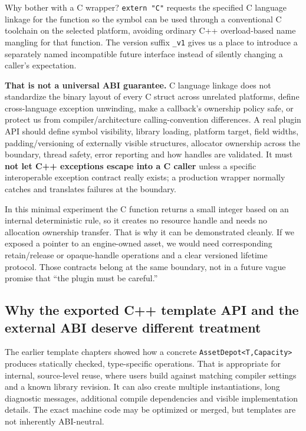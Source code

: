 Why bother with a C wrapper? \texttt{extern\ "C"} requests the specified C language linkage for the function so the symbol can be used through a conventional C toolchain on the selected platform, avoiding ordinary C++ overload-based name mangling for that function. The version suffix \texttt{\_v1} gives us a place to introduce a separately named incompatible future interface instead of silently changing a caller's expectation.

\textbf{That is not a universal ABI guarantee.} C language linkage does not standardize the binary layout of every C struct across unrelated platforms, define cross-language exception unwinding, make a callback's ownership policy safe, or protect us from compiler/architecture calling-convention differences. A real plugin API should define symbol visibility, library loading, platform target, field widths, padding/versioning of externally visible structures, allocator ownership across the boundary, thread safety, error reporting and how handles are validated. It must \textbf{not let C++ exceptions escape into a C caller} unless a specific interoperable exception contract really exists; a production wrapper normally catches and translates failures at the boundary.

In this minimal experiment the C function returns a small integer based on an internal deterministic rule, so it creates no resource handle and needs no allocation ownership transfer. That is why it can be demonstrated cleanly. If we exposed a pointer to an engine-owned asset, we would need corresponding retain/release or opaque-handle operations and a clear versioned lifetime protocol. Those contracts belong at the same boundary, not in a future vague promise that ``the plugin must be careful.''

\subsection{Why the exported C++ template API and the external ABI deserve different treatment}\label{05-engine-i-ch006-why-the-exported-c-template-api-and-the-external-abi-deserve-different-treatment}

The earlier template chapters showed how a concrete \texttt{AssetDepot\textless{}T,Capacity\textgreater{}} produces statically checked, type-specific operations. That is appropriate for internal, source-level reuse, where users build against matching compiler settings and a known library revision. It can also create multiple instantiations, long diagnostic messages, additional compile dependencies and visible implementation details. The exact machine code may be optimized or merged, but templates are not inherently ABI-neutral.

